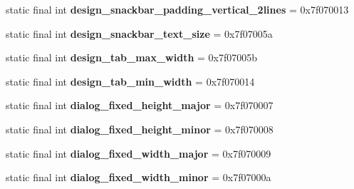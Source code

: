 \begin{DoxyCompactItemize}
\item 
\hypertarget{classandroid_1_1support_1_1design_1_1_r_1_1dimen_a763a99a7ed4d51adad516e2789989919}{}static final int {\bfseries design\+\_\+snackbar\+\_\+padding\+\_\+vertical\+\_\+2lines} = 0x7f070013\label{classandroid_1_1support_1_1design_1_1_r_1_1dimen_a763a99a7ed4d51adad516e2789989919}

\item 
\hypertarget{classandroid_1_1support_1_1design_1_1_r_1_1dimen_a52aa6de59674be234038a285bd18813e}{}static final int {\bfseries design\+\_\+snackbar\+\_\+text\+\_\+size} = 0x7f07005a\label{classandroid_1_1support_1_1design_1_1_r_1_1dimen_a52aa6de59674be234038a285bd18813e}

\item 
\hypertarget{classandroid_1_1support_1_1design_1_1_r_1_1dimen_a5b6cc64ba88e605a0388ebbfe495d251}{}static final int {\bfseries design\+\_\+tab\+\_\+max\+\_\+width} = 0x7f07005b\label{classandroid_1_1support_1_1design_1_1_r_1_1dimen_a5b6cc64ba88e605a0388ebbfe495d251}

\item 
\hypertarget{classandroid_1_1support_1_1design_1_1_r_1_1dimen_a2684f1df7b43f3c950f74c4de9aee2cb}{}static final int {\bfseries design\+\_\+tab\+\_\+min\+\_\+width} = 0x7f070014\label{classandroid_1_1support_1_1design_1_1_r_1_1dimen_a2684f1df7b43f3c950f74c4de9aee2cb}

\item 
\hypertarget{classandroid_1_1support_1_1design_1_1_r_1_1dimen_a7d982a70f8fe2b22a40f0ca43d0c50e6}{}static final int {\bfseries dialog\+\_\+fixed\+\_\+height\+\_\+major} = 0x7f070007\label{classandroid_1_1support_1_1design_1_1_r_1_1dimen_a7d982a70f8fe2b22a40f0ca43d0c50e6}

\item 
\hypertarget{classandroid_1_1support_1_1design_1_1_r_1_1dimen_a06e7f792a3148e50450a94ad0fe0249f}{}static final int {\bfseries dialog\+\_\+fixed\+\_\+height\+\_\+minor} = 0x7f070008\label{classandroid_1_1support_1_1design_1_1_r_1_1dimen_a06e7f792a3148e50450a94ad0fe0249f}

\item 
\hypertarget{classandroid_1_1support_1_1design_1_1_r_1_1dimen_a7de4278fd677ac5a62001924a804377c}{}static final int {\bfseries dialog\+\_\+fixed\+\_\+width\+\_\+major} = 0x7f070009\label{classandroid_1_1support_1_1design_1_1_r_1_1dimen_a7de4278fd677ac5a62001924a804377c}

\item 
\hypertarget{classandroid_1_1support_1_1design_1_1_r_1_1dimen_ab07db9c92256c3cff825b13409bfff5a}{}static final int {\bfseries dialog\+\_\+fixed\+\_\+width\+\_\+minor} = 0x7f07000a\label{classandroid_1_1support_1_1design_1_1_r_1_1dimen_ab07db9c92256c3cff825b13409bfff5a}


\end{DoxyCompactItemize}
